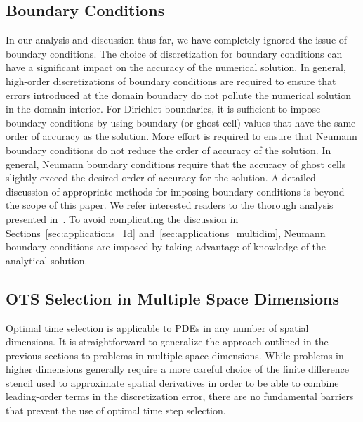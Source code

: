 \documentclass[oneeqnum,onefignum,onetabnum,onethmnum]{siamltex}
\begin{document}
\subsection{Boundary Conditions}
In our analysis and discussion thus far, we have completely ignored the issue 
of boundary conditions.  The choice of discretization for boundary conditions
can have a significant impact on the accuracy of the numerical solution.  In 
general, high-order discretizations of boundary conditions are required to 
ensure that errors introduced at the domain boundary do not pollute the 
numerical solution in the domain interior.  For Dirichlet boundaries, it
is sufficient to impose boundary conditions by using boundary (or ghost cell) 
values that have the same order of accuracy as the solution.  
More effort is required to ensure that Neumann boundary conditions do not
reduce the order of accuracy of the solution.  In general, Neumann boundary
conditions require that the accuracy of ghost cells slightly exceed the 
desired order of accuracy for the solution.  A detailed discussion of 
appropriate methods for imposing boundary conditions is beyond the scope of 
this paper.  We refer interested readers to the thorough analysis presented
in~\cite{gko_book}.  To avoid complicating the discussion in 
Sections~\ref{sec:applications_1d} and~\ref{sec:applications_multidim}, 
Neumann boundary conditions are imposed by taking advantage of knowledge of 
the analytical solution.


\subsection{OTS Selection in Multiple Space Dimensions
                \label{sec:ots_higher_spatial_dims}}
Optimal time selection is applicable to PDEs in any number of spatial 
dimensions.  It is straightforward to generalize the approach outlined in 
the previous sections to problems in multiple space dimensions.  While 
problems in higher dimensions generally require a more careful choice of 
the finite difference stencil used to approximate spatial derivatives in 
order to be able to combine leading-order terms in the discretization error, 
there are no fundamental barriers that prevent the use of optimal time step 
selection.
\end{document}
